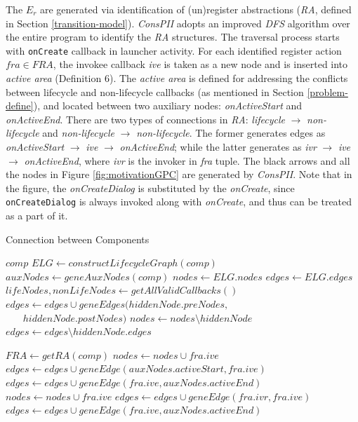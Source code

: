 The $E_{r}$ are generated via identification of (un)register abstractions (\textit{RA}, defined in Section \ref{transition-model}).
\textit{ConsPII} adopts an improved \textit{DFS} algorithm over the entire program to identify the \textit{RA} structures. The traversal process starts with \texttt{onCreate} callback in launcher activity. For each identified register action $fra\in FRA$, the invokee callback \textit{ive} is taken as a new node and is inserted into \textit{active area} (Definition 6). The \textit{active area} is defined for addressing the conflicts between lifecycle and non-lifecycle callbacks (as mentioned in Section \ref{problem-define}), and located between two auxiliary nodes: \textit{onActiveStart} and \textit{onActiveEnd}. There are two types of connections in \textit{RA}: \textit{lifecycle} $\rightarrow $ \textit{non-lifecycle} and \textit{non-lifecycle} $\rightarrow $ \textit{non-lifecycle}. The former generates edges as  \textit{onActiveStart} $\rightarrow $ \textit{ive} $\rightarrow $ \textit{onActiveEnd}; while the latter generates as \textit{ivr} $\rightarrow $ \textit{ive} $\rightarrow $ \textit{onActiveEnd}, where \textit{ivr} is the invoker in \textit{fra} tuple. The black arrows and all the nodes in Figure \ref{fig:motivationGPC} are generated by \textit{ConsPII}. Note that in the figure, the \textit{onCreateDialog} is substituted by the \textit{onCreate}, since \texttt{onCreateDialog} is always invoked along with \textit{onCreate}, and thus can be treated as a part of it.



\begin{algorithm}
\caption{Connection between Components}
\footnotesize
\begin{algorithmic}[1]
 {$comp$}
\State $ELG \leftarrow constructLifecycleGraph(comp)$
\State $ auxNodes \leftarrow geneAuxNodes(comp)$
\State $    nodes \leftarrow ELG.nodes$
\State $    edges \leftarrow ELG.edges$
\State $     lifeNodes, nonLifeNodes \leftarrow getAllValidCallbacks()$
\State $        edges \leftarrow edges \cup geneEdges(hiddenNode.preNodes,$\\
 $\ \ \ \ \ \ \ \        hiddenNode.postNodes)$
\State $        nodes \leftarrow nodes \setminus hiddenNode$
\State $        edges \leftarrow edges \setminus hiddenNode.edges$
\EndFor

\State $ FRA \leftarrow getRA(comp)$
\State $            nodes \leftarrow nodes \cup fra.ive$
\State $            edges \leftarrow edges \cup geneEdge(auxNodes.activeStart, fra.ive)$
\State $            edges \leftarrow edges \cup geneEdge(fra.ive, auxNodes.activeEnd )$
\State $  nodes \leftarrow nodes \cup fra.ive$
\State $  edges \leftarrow edges \cup geneEdge(fra.ivr, fra.ive)$
\State $  edges \leftarrow edges \cup geneEdge(fra.ive, auxNodes.activeEnd )$
\EndIf
\EndFor
\EndProcedure
\end{algorithmic}
\label{fig:alg1}
\end{algorithm}


